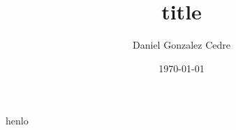 

\title{title}
\author[Daniel Gonzalez Cedre]{Daniel Gonzalez Cedre}
\date{\today}



  \maketitle

  henlo


